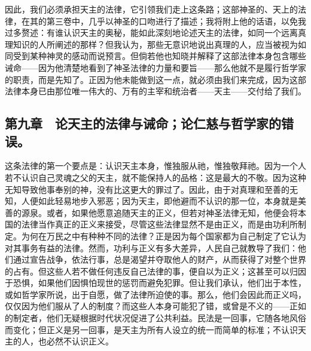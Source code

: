 因此，我们必须承担天主的法律，它引领我们走上这条路；这部神圣的、天上的法律，在其的第三卷中，几乎以神圣的口吻进行了描述；我将附上他的话语，以免我过多赘述：有谁认识天主的奥秘，能如此深刻地论述天主的法律，如同一个远离真理知识的人所阐述的那样？但我认为，那些无意识地说出真理的人，应当被视为如同受到某种神灵的感动而说预言。但倘若他也知晓并解释了这部法律本身包含哪些诫命——因为他清楚地看到了神圣法律的力量和要旨——那么他就不是履行哲学家的职责，而是先知了。正因为他未能做到这一点，就必须由我们来完成，因为这部法律本身已由那位唯一伟大的、万有的主宰和统治者——天主——交付给了我们。\par


\subsection{第九章　论天主的法律与诫命；论仁慈与哲学家的错误。}

这条法律的第一个要点是：认识天主本身，惟独服从祂，惟独敬拜祂。因为一个人若不认识自己灵魂之父的天主，就不能保持人的品格：这是最大的不敬。因为这种无知导致他事奉别的神，没有比这更大的罪过了。因此，由于对真理和至善的无知，人便如此轻易地步入邪恶；因为天主，即他避而不认识的那一位，本身就是美善的源泉。或者，如果他愿意追随天主的正义，但若对神圣法律无知，他便会将本国的法律当作真正的正义来接受，尽管这些法律显然不是由正义，而是由功利所制定。为何在万民之中有种种不同的法律？正是因为每个国家都为自己制定了它认为对其事务有益的法律。然而，功利与正义有多大差异，人民自己就教导了我们：他们通过宣告战争，依法行事，总是渴望并夺取他人的财产，从而获得了对整个世界的占有。但这些人若不做任何违反自己法律的事，便自以为正义；这甚至可以归因于恐惧，如果他们因惧怕现世的惩罚而避免犯罪。但让我们承认，他们出于本性，或如哲学家所说，出于自愿，做了法律所迫使的事。那么，他们会因此而正义吗，仅仅因为他们服从了人的制度？而这些人本身可能犯了错，或曾是不义的——正如的制定者，他们无疑根据时代状况促进了公共利益。民法是一回事，它随各地风俗而变化；但正义是另一回事，是天主为所有人设立的统一而简单的标准；不认识天主的人，也必然不认识正义。\par

